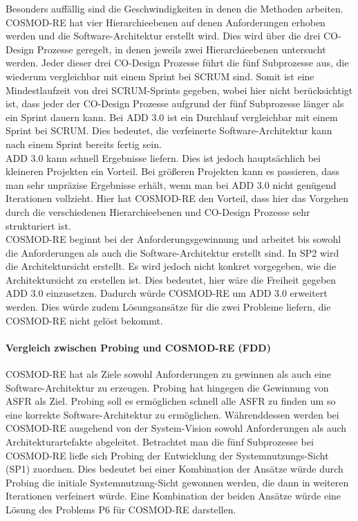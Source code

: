 Besonders auffällig sind die Geschwindigkeiten in denen die Methoden arbeiten. COSMOD-RE hat vier Hierarchieebenen auf denen Anforderungen erhoben werden und die Software-Architektur erstellt wird. Dies wird über die drei CO-Design Prozesse geregelt, in denen jeweils zwei Hierarchieebenen untersucht werden. Jeder dieser drei CO-Design Prozesse führt die fünf Subprozesse aus, die wiederum vergleichbar mit einem Sprint bei SCRUM sind. Somit ist eine Mindestlaufzeit von drei SCRUM-Sprints gegeben, wobei hier nicht berücksichtigt ist, dass jeder der CO-Design Prozesse aufgrund der fünf Subprozesse länger als ein Sprint dauern kann. Bei ADD 3.0 ist ein Durchlauf vergleichbar mit einem Sprint bei SCRUM. Dies bedeutet, die verfeinerte Software-Architektur kann nach einem Sprint bereits fertig sein.\\

ADD 3.0 kann schnell Ergebnisse liefern. Dies ist jedoch hauptsächlich bei kleineren Projekten ein Vorteil. Bei größeren Projekten kann es passieren, dass man sehr unpräzise Ergebnisse erhält, wenn man bei ADD 3.0 nicht genügend Iterationen vollzieht. Hier hat COSMOD-RE den Vorteil, dass hier das Vorgehen durch die verschiedenen Hierarchieebenen und CO-Design Prozesse sehr strukturiert ist.\\

COSMOD-RE beginnt bei der Anforderungsgewinnung und arbeitet bis sowohl die Anforderungen als auch die Software-Architektur erstellt sind. In SP2 wird die Architektursicht erstellt. Es wird jedoch nicht konkret vorgegeben, wie die Architektursicht zu erstellen ist. Dies bedeutet, hier wäre die Freiheit gegeben ADD 3.0 einzusetzen. Dadurch würde COSMOD-RE um ADD 3.0 erweitert werden. Dies würde zudem Lösungsansätze für die zwei Probleme liefern, die COSMOD-RE nicht gelöst bekommt.\\

\paragraph{Vergleich zwischen Probing und  COSMOD-RE (FDD)}
COSMOD-RE hat als Ziele sowohl Anforderungen zu gewinnen als auch eine Software-Architektur zu erzeugen. Probing hat hingegen die Gewinnung von ASFR als Ziel. Probing soll es ermöglichen schnell alle ASFR zu finden um so eine korrekte Software-Architektur zu ermöglichen. Währenddessen werden bei COSMOD-RE ausgehend von der System-Vision sowohl Anforderungen als auch Architekturartefakte abgeleitet. Betrachtet man die fünf Subprozesse bei COSMOD-RE ließe sich Probing der Entwicklung der Systemnutzungs-Sicht (SP1) zuordnen. Dies bedeutet bei einer Kombination der Ansätze würde durch Probing die initiale Systemnutzung-Sicht gewonnen werden, die dann in weiteren Iterationen verfeinert würde. Eine Kombination der beiden Ansätze würde eine Lösung des Problems P6 für COSMOD-RE darstellen.\\
